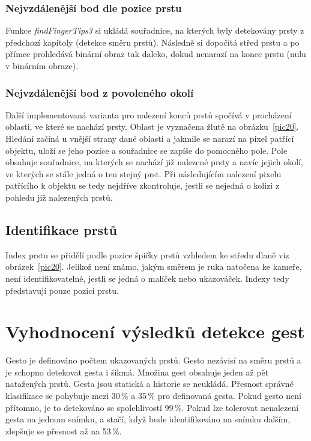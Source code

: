 \subsubsection{Nejvzdálenější bod dle pozice prstu}
Funkce \textit{findFingerTips3} si ukládá souřadnice, na kterých byly detekovány prsty z předchozí kapitoly (detekce směru prstů). Následně si dopočítá střed prstu a po přímce prohledává binární obraz tak daleko, dokud nenarazí na konec prstu (nulu v binárním obraze). 

\subsubsection{Nejvzdálenější bod z povoleného okolí}
Další implementovaná varianta pro nalezení konců prstů spočívá v procházení oblasti, ve které se nachází prsty. Oblast je vyznačena žlutě na obrázku~\ref{pic20}. Hledání začíná u vnější strany dané oblasti a jakmile se narazí na pixel patřící objektu, uloží se jeho pozice a souřadnice se zapíše do pomocného pole. Pole obsahuje souřadnice, na kterých se nachází již nalezené prsty a navíc jejich okolí, ve kterých se stále jedná o ten stejný prst. Při následujícím nalezení pixelu patřícího k objektu se tedy nejdříve zkontroluje, jestli se nejedná o kolizi z pohledu již nalezených prstů.

\subsection{Identifikace prstů}
Index prstu se přidělí podle pozice špičky prstů vzhledem ke středu dlaně viz obrázek~\ref{pic20}. Jelikož není známo, jakým směrem je ruka natočena ke kameře, není identifikovatelné, jestli se jedná o malíček nebo ukazováček. Indexy tedy představují pouze pozici prstu.
\newpage
\section{Vyhodnocení výsledků detekce gest}

Gesto je definováno počtem ukazovaných prstů. Gesto nezávisí na směru prstů a je schopno detekovat gesta i šikmá. Množina gest obsahuje jeden až pět natažených prstů. Gesta jsou statická a historie se neukládá. Přesnost správné klasifikace se pohybuje mezi 30\,\% a 35\,\% pro definovaná gesta. Pokud gesto není přítomno, je to detekováno se spolehlivostí 99\,\%. Pokud lze tolerovat nenalezení gesta na jednom snímku, a stačí, když bude identifikováno na snímku dalším, zlepšuje se přesnost až na 53\,\%.

